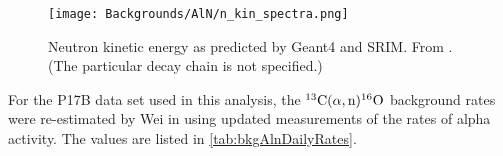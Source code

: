 \documentclass[../thesis.tex]{subfiles}
\begin{document}
\begin{figure}[ht]
  \texttt{[image: Backgrounds/AlN/n\_kin\_spectra.png]}
  \caption{Neutron kinetic energy as predicted by Geant4 and SRIM. From \cite{Zhao_2014}. (The particular decay chain is not specified.)}
  \label{fig:aln_n_kin_spectra}
\end{figure}

For the P17B data set used in this analysis, the $\CanO$ background rates were re-estimated by Wei in \cite{lianghongBkg} using updated measurements of the rates of alpha activity. The values are listed in \autoref{tab:bkgAlnDailyRates}.

\begin{table}[ht]
  \caption{$\CanO$ background rates for the P17B data set \cite{lianghongBkg}.}
  \label{tab:bkgAlnDailyRates}
\end{table}

\end{document}
